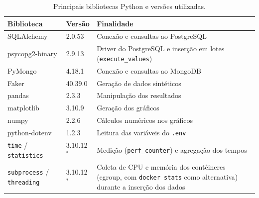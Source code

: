 
\begin{table}[H]
\centering
\renewcommand{\arraystretch}{1.1}
\caption{Principais bibliotecas Python e versões utilizadas.}
\label{tab:versoes}
\small
\begin{tabular}{|l|l|p{7.2cm}|}
\hline
\textbf{Biblioteca} & \textbf{Versão} & \textbf{Finalidade} \\ \hline
SQLAlchemy & 2.0.53 & Conexão e consultas ao PostgreSQL \\ \hline
psycopg2-binary & 2.9.13 & Driver do PostgreSQL e inserção em lotes (\texttt{execute\_values}) \\ \hline
PyMongo & 4.18.1 & Conexão e consultas ao MongoDB \\ \hline
Faker & 40.39.0 & Geração de dados sintéticos \\ \hline
pandas & 2.3.3 & Manipulação dos resultados \\ \hline
matplotlib & 3.10.9 & Geração dos gráficos \\ \hline
numpy & 2.2.6 & Cálculos numéricos nos gráficos \\ \hline
python-dotenv & 1.2.3 & Leitura das variáveis do \texttt{.env} \\ \hline
\texttt{time} / \texttt{statistics} & 3.10.12$^{*}$ & Medição (\texttt{perf\_counter}) e agregação dos tempos \\ \hline
\texttt{subprocess} / \texttt{threading} & 3.10.12$^{*}$ & Coleta de CPU e memória dos contêineres (cgroup, com \texttt{docker stats} como alternativa) durante a inserção dos dados \\ \hline
\end{tabular}
\vspace{0.4em}
\end{table}
